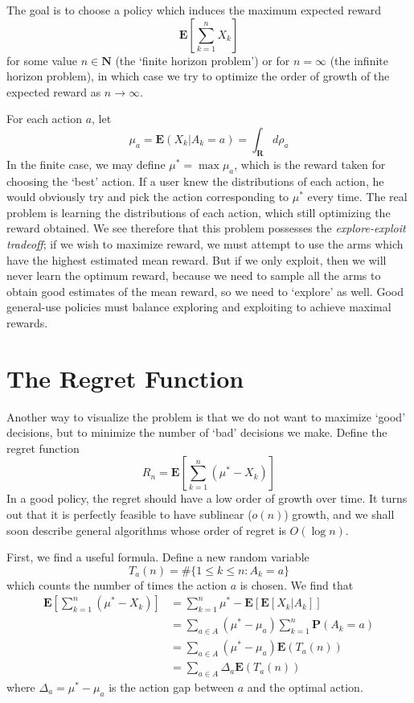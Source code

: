 The goal is to choose a policy which induces the maximum expected reward
%
\[ \mathbf{E} \left[\sum_{k=1}^n X_k \right] \]
%
for some value $n \in \mathbf{N}$ (the `finite horizon problem') or for $n = \infty$ (the infinite horizon problem), in which case we try to optimize the order of growth of the expected reward as $n \to \infty$.

For each action $a$, let
%
\[ \mu_a = \mathbf{E}(X_k | A_k = a) = \int_\mathbf{R} d \rho_a \]
%
In the finite case, we may define $\mu^* = \max \mu_a$, which is the reward taken for choosing the `best' action. If a user knew the distributions of each action, he would obviously try and pick the action corresponding to $\mu^*$ every time. The real problem is learning the distributions of each action, which still optimizing the reward obtained. We see therefore that this problem possesses the {\it explore-exploit tradeoff}; if we wish to maximize reward, we must attempt to use the arms which have the highest estimated mean reward. But if we only exploit, then we will never learn the optimum reward, because we need to sample all the arms to obtain good estimates of the mean reward, so we need to `explore' as well. Good general-use policies must balance exploring and exploiting to achieve maximal rewards.

\section{The Regret Function}

Another way to visualize the problem is that we do not want to maximize `good' decisions, but to minimize the number of `bad' decisions we make. Define the regret function
%
\[ R_n = \mathbf{E} \left[\sum_{k = 1}^n (\mu^* - X_k) \right] \]
%
In a good policy, the regret should have a low order of growth over time. It turns out that it is perfectly feasible to have sublinear ($o(n)$) growth, and we shall soon describe general algorithms whose order of regret is $O(\log n)$.

First, we find a useful formula. Define a new random variable
%
\[ T_a(n) = \# \{ 1 \leq k \leq n : A_k = a \} \]
%
which counts the number of times the action $a$ is chosen. We find that
%
\begin{align*}
    \mathbf{E} \left[\sum_{k = 1}^n (\mu^* - X_k) \right] &= \sum_{k = 1}^n \mu^* - \mathbf{E}[ \mathbf{E}[X_k | A_k] ]\\
    &= \sum_{a \in A} (\mu^* - \mu_a) \sum_{k = 1}^n \mathbf{P}(A_k = a)\\
    &= \sum_{a \in A} (\mu^* - \mu_a) \mathbf{E}(T_a(n))\\
    &= \sum_{a \in A} \Delta_a \mathbf{E}(T_a(n))
\end{align*}
%
where $\Delta_a = \mu^* - \mu_a$ is the action gap between $a$ and the optimal action.


